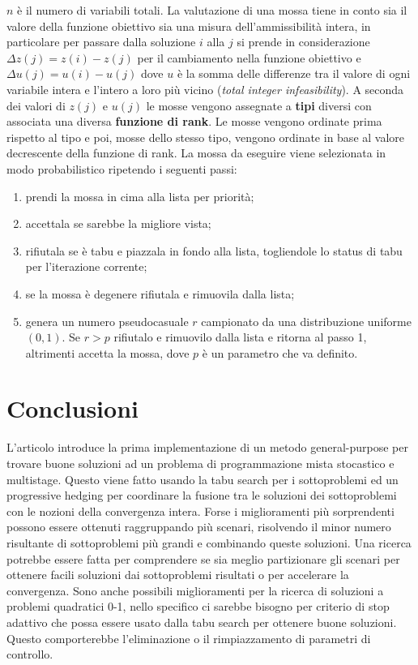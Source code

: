 \documentclass[
]{article}
\providecommand{\tightlist}{%
  \setlength{\itemsep}{0pt}\setlength{\parskip}{0pt}}
\begin{document}
{\(n\)} è il numero di variabili totali. La valutazione di una mossa
tiene in conto sia il valore della funzione obiettivo sia una misura
dell'ammissibilità intera, in particolare per passare dalla soluzione
{\(i\)} alla {\(j\)} si prende in considerazione
{\(\Delta z(j) = z(i) - z(j)\)} per il cambiamento nella funzione
obiettivo e {\(\Delta u(j) = u(i) - u(j)\)} dove {\(u\)} è la somma
delle differenze tra il valore di ogni variabile intera e l'intero a
loro più vicino (\emph{total integer infeasibility}). A seconda dei
valori di {\(z(j)\)} e {\(u(j)\)} le mosse vengono assegnate a
\textbf{tipi} diversi con associata una diversa \textbf{funzione di
rank}. Le mosse vengono ordinate prima rispetto al tipo e poi, mosse
dello stesso tipo, vengono ordinate in base al valore decrescente della
funzione di rank. La mossa da eseguire viene selezionata in modo
probabilistico ripetendo i seguenti passi:
\begin{enumerate}
\tightlist
\item
  prendi la mossa in cima alla lista per priorità;
\item
  accettala se sarebbe la migliore vista;
\item
  rifiutala se è tabu e piazzala in fondo alla lista, togliendole lo
  status di tabu per l'iterazione corrente;
\item
  se la mossa è degenere rifiutala e rimuovila dalla lista;
\item
  genera un numero pseudocasuale {\(r\)} campionato da una distribuzione
  uniforme {\((0,1)\)}. Se {\(r > p\)} rifiutalo e rimuovilo dalla lista
  e ritorna al passo 1, altrimenti accetta la mossa, dove {\(p\)} è un
  parametro che va definito.
\end{enumerate}

\hypertarget{conclusioni}{%
\section{Conclusioni}\label{conclusioni}}

L'articolo introduce la prima implementazione di un metodo
general-purpose per trovare buone soluzioni ad un problema di
programmazione mista stocastico e multistage. Questo viene fatto usando
la tabu search per i sottoproblemi ed un progressive hedging per
coordinare la fusione tra le soluzioni dei sottoproblemi con le nozioni
della convergenza intera. Forse i miglioramenti più sorprendenti possono
essere ottenuti raggruppando più scenari, risolvendo il minor numero
risultante di sottoproblemi più grandi e combinando queste soluzioni.
Una ricerca potrebbe essere fatta per comprendere se sia meglio
partizionare gli scenari per ottenere facili soluzioni dai sottoproblemi
risultati o per accelerare la convergenza. Sono anche possibili
miglioramenti per la ricerca di soluzioni a problemi quadratici 0-1,
nello specifico ci sarebbe bisogno per criterio di stop adattivo che
possa essere usato dalla tabu search per ottenere buone soluzioni.
Questo comporterebbe l'eliminazione o il rimpiazzamento di parametri di
controllo.
\end{document}
